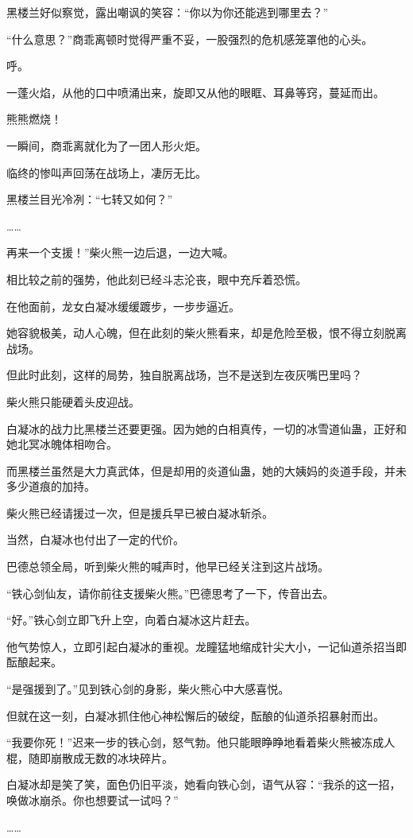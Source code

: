 \begin{this_body}
黑楼兰好似察觉，露出嘲讽的笑容：“你以为你还能逃到哪里去？”

“什么意思？”商乖离顿时觉得严重不妥，一股强烈的危机感笼罩他的心头。

呼。

一蓬火焰，从他的口中喷涌出来，旋即又从他的眼眶、耳鼻等窍，蔓延而出。

熊熊燃烧！

一瞬间，商乖离就化为了一团人形火炬。

临终的惨叫声回荡在战场上，凄厉无比。

黑楼兰目光冷冽：“七转又如何？”

……

再来一个支援！”柴火熊一边后退，一边大喊。

相比较之前的强势，他此刻已经斗志沦丧，眼中充斥着恐慌。

在他面前，龙女白凝冰缓缓踱步，一步步逼近。

她容貌极美，动人心魄，但在此刻的柴火熊看来，却是危险至极，恨不得立刻脱离战场。

但此时此刻，这样的局势，独自脱离战场，岂不是送到左夜灰嘴巴里吗？

柴火熊只能硬着头皮迎战。

白凝冰的战力比黑楼兰还要更强。因为她的白相真传，一切的冰雪道仙蛊，正好和她北冥冰魄体相吻合。

而黑楼兰虽然是大力真武体，但是却用的炎道仙蛊，她的大姨妈的炎道手段，并未多少道痕的加持。

柴火熊已经请援过一次，但是援兵早已被白凝冰斩杀。

当然，白凝冰也付出了一定的代价。

巴德总领全局，听到柴火熊的喊声时，他早已经关注到这片战场。

“铁心剑仙友，请你前往支援柴火熊。”巴德思考了一下，传音出去。

“好。”铁心剑立即飞升上空，向着白凝冰这片赶去。

他气势惊人，立即引起白凝冰的重视。龙瞳猛地缩成针尖大小，一记仙道杀招当即酝酿起来。

“是强援到了。”见到铁心剑的身影，柴火熊心中大感喜悦。

但就在这一刻，白凝冰抓住他心神松懈后的破绽，酝酿的仙道杀招暴射而出。

“我要你死！”迟来一步的铁心剑，怒气勃。他只能眼睁睁地看着柴火熊被冻成人棍，随即崩散成无数的冰块碎片。

白凝冰却是笑了笑，面色仍旧平淡，她看向铁心剑，语气从容：“我杀的这一招，唤做冰崩杀。你也想要试一试吗？”

……


\end{this_body}
